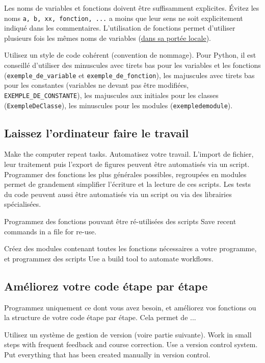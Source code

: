 \documentclass{article}
\begin{document}
Les noms de variables et fonctions doivent être suffisamment explicites. Évitez les noms \texttt{a, b, xx, fonction, ...} a moins que leur sens ne soit explicitement indiqué dans les commentaires. L'utilisation de fonctions permet d'utiliser plusieurs fois les mêmes noms de variables (\href{https://fr.wikipedia.org/wiki/Variable_locale}{dans sa portée locale}).

Utilisez un style de code cohérent (convention de nommage). Pour Python, il est conseillé d'utiliser des minuscules avec tirets bas pour les variables et les fonctions (\texttt{exemple\_de\_variable} et \texttt{exemple\_de\_fonction}), les majuscules avec tirets bas pour les constantes (variables ne devant pas être modifiées, \texttt{EXEMPLE\_DE\_CONSTANTE}), les majuscules aux initiales pour les classes (\texttt{ExempleDeClasse}), les minuscules pour les modules (\texttt{exempledemodule}).

\subsection{Laissez l'ordinateur faire le travail}

    Make the computer repeat tasks.
Automatisez votre travail. L'import de fichier, leur traitement puis l'export de figures peuvent être automatisés via un script. Programmer des fonctions les plus générales possibles, regroupées en modules permet de grandement simplifier l'écriture et la lecture de ces scripts. Les tests du code peuvent aussi être automatisés via un script ou via des librairies spécialisées.

Programmez des fonctions pouvant être ré-utilisées des scripts 
    Save recent commands in a file for re-use.

Créez des modules contenant toutes les fonctions nécessaires a votre programme, et programmez des scripts 
    Use a build tool to automate workflows.

\subsection{Améliorez votre code étape par étape}

Programmez uniquement ce dont vous avez besoin, et améliorez vos fonctions ou la structure de votre code étape par étape. Cela permet de ...

Utilisez un système de gestion de version (voire partie suivante).
    Work in small steps with frequent feedback and course correction.
    Use a version control system.
    Put everything that has been created manually in version control.
\end{document}
